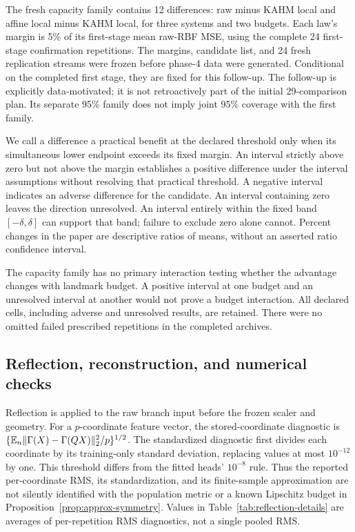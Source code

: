 The fresh capacity family contains 12 differences: raw minus KAHM
local and affine local minus KAHM local, for three systems and two
budgets. Each law's margin is 5\% of its first-stage mean raw-RBF
MSE, using the complete 24 first-stage confirmation repetitions.
The margins, candidate list, and 24 fresh replication streams were
frozen before phase-4 data were generated. Conditional on the completed
first stage, they are fixed for this follow-up. The follow-up is
explicitly data-motivated; it is not retroactively part of the initial
29-comparison plan. Its separate 95\% family does not imply joint
95\% coverage with the first family.

We call a difference a practical benefit at the declared threshold
only when its simultaneous lower endpoint exceeds its fixed margin.
An interval strictly above zero but not above the margin establishes
a positive difference under the interval assumptions without resolving
that practical threshold. A negative interval indicates an adverse
difference for the candidate. An interval containing zero leaves the
direction unresolved. An interval entirely within the fixed band
$[-\delta,\delta]$ can support that band; failure to exclude zero
alone cannot. Percent changes in the paper are descriptive ratios of
means, without an asserted ratio confidence interval.

The capacity family has no primary interaction testing whether the
advantage changes with landmark budget. A positive interval at one
budget and an unresolved interval at another would not prove a budget
interaction. All declared cells, including adverse and unresolved
results, are retained. There were no omitted failed prescribed
repetitions in the completed archives.

\subsection{Reflection, reconstruction, and numerical checks}

Reflection is applied to the raw branch input before the frozen scaler
and geometry. For a $p$-coordinate feature vector, the stored-coordinate
diagnostic is
$\{\mathbb{E}_n\|\Gamma(X)-\Gamma(QX)\|_2^2/p\}^{1/2}$.
The standardized diagnostic first divides each coordinate by its
training-only standard deviation, replacing values at most $10^{-12}$
by one. This threshold differs from the fitted heads' $10^{-8}$ rule.
Thus the reported per-coordinate RMS, its standardization, and its
finite-sample approximation are not silently identified with the
population metric or a known Lipschitz budget in
Proposition~\ref{prop:approx-symmetry}. Values in
Table~\ref{tab:reflection-details} are averages of per-repetition RMS
diagnostics, not a single pooled RMS.

